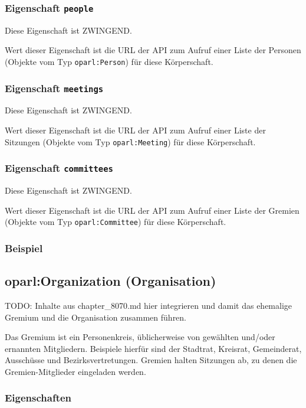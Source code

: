 \documentclass[,a4paper]{article}
\begin{document}
\subsubsection{Eigenschaft \texttt{people}}\label{eigenschaft-people}

Diese Eigenschaft ist ZWINGEND.

Wert dieser Eigenschaft ist die URL der API zum Aufruf einer Liste der
Personen (Objekte vom Typ \texttt{oparl:Person}) für diese Körperschaft.

\subsubsection{Eigenschaft
\texttt{meetings}}\label{eigenschaft-meetings}

Diese Eigenschaft ist ZWINGEND.

Wert dieser Eigenschaft ist die URL der API zum Aufruf einer Liste der
Sitzungen (Objekte vom Typ \texttt{oparl:Meeting}) für diese
Körperschaft.

\subsubsection{Eigenschaft
\texttt{committees}}\label{eigenschaft-committees}

Diese Eigenschaft ist ZWINGEND.

Wert dieser Eigenschaft ist die URL der API zum Aufruf einer Liste der
Gremien (Objekte vom Typ \texttt{oparl:Committee}) für diese
Körperschaft.

\subsubsection{Beispiel}\label{beispiel}

\subsection{oparl:Organization
(Organisation)}\label{oparlux5forganisation}

TODO: Inhalte aus chapter\_8070.md hier integrieren und damit das
ehemalige Gremium und die Organisation zusammen führen.

Das Gremium ist ein Personenkreis, üblicherweise von gewählten und/oder
ernannten Mitgliedern. Beispiele hierfür sind der Stadtrat, Kreisrat,
Gemeinderat, Ausschüsse und Bezirksvertretungen. Gremien halten
Sitzungen ab, zu denen die Gremien-Mitglieder eingeladen werden.

\subsubsection{Eigenschaften}\label{eigenschaften-1}
\end{document}
